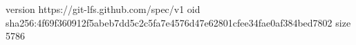 version https://git-lfs.github.com/spec/v1
oid sha256:4f69f360912f5abeb7dd5c2c5fa7e4576d47e62801cfee34fae0af384bed7802
size 5786

